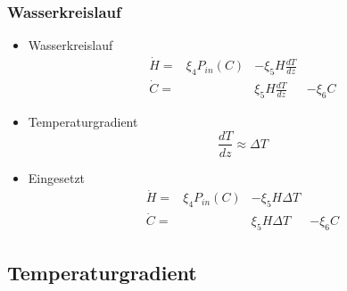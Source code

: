 \documentclass[english, aspectratio=169]{beamer}
\begin{document}
\begin{frame}
	\frametitle{Wasserkreislauf}
	\begin{itemize}
	
		\item[] Wasserkreislauf
			\begin{equation}
				\begin{matrix}			
					\dot{H} = & \xi_4 P_{in}(C) & - \xi_5  H \frac{dT}{dz} & \\
					\dot{C} = &                 &   \xi_5  H \frac{dT}{dz} & - \xi_6 C
				\end{matrix}	
			\end{equation}
	
		\pause	
	
		\item[] Temperaturgradient
			\begin{equation}
				\frac{dT}{dz} \approx \Delta T
			\end{equation}
		
		\pause		
		
		\item[] Eingesetzt
			\begin{equation}
				\begin{matrix}			
					\dot{H} = & \xi_4 P_{in}(C) & - \xi_5 H \Delta T & \\
					\dot{C} = &                 &   \xi_5 H \Delta T & - \xi_6 C
				\end{matrix}	
			\end{equation}			
		
	\end{itemize}
\end{frame}

\subsection{Temperaturgradient}
\end{document}

